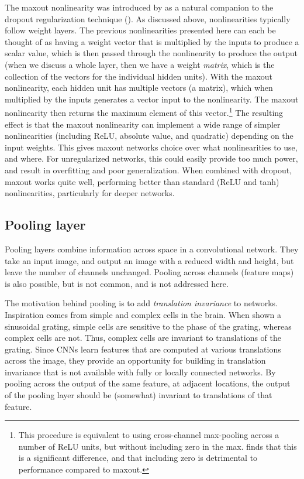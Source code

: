 The maxout nonlinearity was introduced by \textcite{Goodfellow2013}
as a natural companion to the dropout regularization technique ().
As discussed above, nonlinearities typically follow weight layers.
The previous nonlinearities presented here can each be thought of
as having a weight vector that is multiplied by the inputs to produce a scalar value,
which is then passed through the nonlinearity to produce the output
(when we discuss a whole layer, then we have a weight \emph{matrix},
which is the collection of the vectors for the individual hidden units).
With the maxout nonlinearity, each hidden unit has multiple vectors (a matrix),
which when multiplied by the inputs generates a vector input to the nonlinearity.
The maxout nonlinearity then returns the maximum element of this vector.\footnote{
  This procedure is equivalent to using cross-channel max-pooling
  across a number of ReLU units,
  but without including zero in the max.
  \textcite{Goodfellow2013} finds that this is a significant difference,
  and that including zero is detrimental to performance compared to maxout.}
The resulting effect is that the maxout nonlinearity can implement
a wide range of simpler nonlinearities (including ReLU, absolute value, and quadratic)
depending on the input weights.
This gives maxout networks choice over what nonlinearities to use, and where.
For unregularized networks, this could easily provide too much power,
and result in overfitting and poor generalization.
When combined with dropout, maxout works quite well,
performing better than standard (ReLU and tanh) nonlinearities,
particularly for deeper networks.


\subsection{Pooling layer}

Pooling layers combine information across space in a convolutional network.
They take an input image, and output an image with a reduced width and height,
but leave the number of channels unchanged.
Pooling across channels (feature maps) is also possible,
but is not common, and is not addressed here.

The motivation behind pooling is to add \emph{translation invariance}
to networks.
Inspiration comes from simple and complex cells in the brain.
When shown a sinusoidal grating,
simple cells are sensitive to the phase of the grating,
whereas complex cells are not.
Thus, complex cells are invariant to translations of the grating.
Since CNNs learn features that are computed at various translations across
the image,
they provide an opportunity for building in translation invariance
that is not available with fully or locally connected networks.
By pooling across the output of the same feature,
at adjacent locations,
the output of the pooling layer should be (somewhat) invariant
to translations of that feature.

